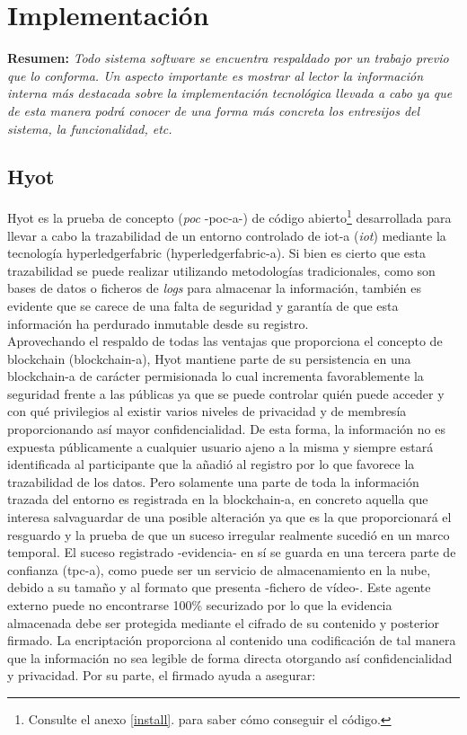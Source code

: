 \documentclass[12pt,a4paper, twoside]{report}
\begin{document}
	\chapter{Implementación} \label{implementationChapter}
	
	\textbf{Resumen:} \textit{Todo sistema software se encuentra respaldado por un trabajo previo que lo conforma. Un aspecto importante es mostrar al lector la información interna más destacada sobre la implementación tecnológica llevada a cabo ya que de esta manera podrá conocer de una forma más concreta los entresijos del sistema, la funcionalidad, etc.}
	
	\section{Hyot}
		
	Hyot es la prueba de concepto (\textit{\gls{poc}} -\gls{poc-a}-) de código abierto\footnote{Consulte el anexo \ref{install}.  para saber cómo conseguir el código.} desarrollada para llevar a cabo la trazabilidad de un entorno controlado de \gls{iot-a} (\textit{\gls{iot}}) mediante la tecnología \gls{hyperledgerfabric} (\gls{hyperledgerfabric-a}). Si bien es cierto que esta trazabilidad se puede realizar utilizando metodologías tradicionales, como son bases de datos o ficheros de \textit{logs} para almacenar la información, también es evidente que se carece de una falta de seguridad y garantía de que esta información ha perdurado inmutable desde su registro. \\
			
	Aprovechando el respaldo de todas las ventajas que proporciona el concepto de \Gls{blockchain} (\gls{blockchain-a}), Hyot mantiene parte de su persistencia en una \gls{blockchain-a} de carácter permisionada lo cual incrementa favorablemente la seguridad frente a las públicas ya que se puede controlar quién puede acceder y con qué privilegios al existir varios niveles de privacidad y de membresía proporcionando así mayor confidencialidad. De esta forma, la información no es expuesta públicamente a cualquier usuario ajeno a la misma y siempre estará identificada al participante que la añadió al registro por lo que favorece la trazabilidad de los datos. Pero solamente una parte de toda la información trazada del entorno es registrada en la \gls{blockchain-a}, en concreto aquella que interesa salvaguardar de una posible alteración ya que es la que proporcionará el resguardo y la prueba de que un suceso irregular realmente sucedió en un marco temporal. El suceso registrado -evidencia- en sí se guarda en una tercera parte de confianza (\gls{tpc-a}), como puede ser un servicio de almacenamiento en la nube, debido a su tamaño y al formato que presenta -fichero de vídeo-. Este agente externo puede no encontrarse 100\% securizado por lo que la evidencia almacenada debe ser protegida mediante el cifrado de su contenido y posterior firmado. La encriptación proporciona al contenido una codificación de tal manera que la información no sea legible de forma directa otorgando así confidencialidad y privacidad. Por su parte, el firmado ayuda a asegurar:
	
\end{document}
